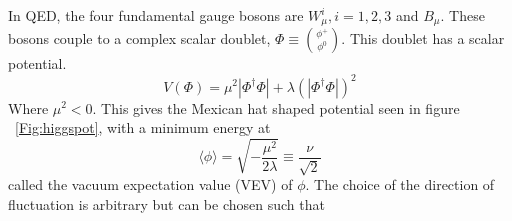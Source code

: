 \indent In QED, the four fundamental gauge bosons are ${W^{i}_{\mu}, i = 1,2,3}$ and ${B_{\mu}}$. These bosons couple to a complex scalar doublet, ${\Phi \equiv \binom{\phi^{+}}{\phi^{0}}}$. This doublet has a scalar potential.
\begin{equation}
V(\Phi) = \mu^{2}|\Phi^{\dagger}\Phi| + \lambda(|\Phi^{\dagger}\Phi|)^{2}
\end{equation}
Where ${\mu^{2} < 0}$. This gives the Mexican hat shaped potential seen in figure ~\ref{Fig:higgspot}, with a minimum energy at 
\begin{equation}
\langle \phi \rangle = \sqrt{-\frac{\mu^{2}}{2\lambda}}\equiv \frac{\nu}{\sqrt{2}}
\end{equation}
called the vacuum expectation value (VEV) of ${\phi}$. The choice of the direction of fluctuation is arbitrary but can be chosen such that


